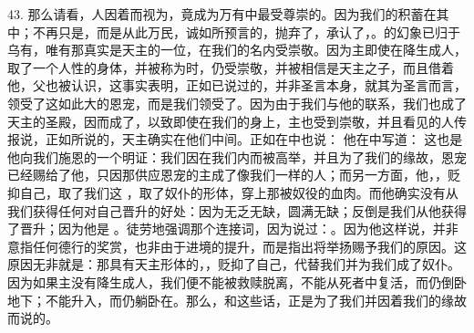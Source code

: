 43. 那么请看，人因着而视为，竟成为万有中最受尊崇的。因为我们的积蓄在其中；不再只是，而是从此万民，诚如所预言的，抛弃了，承认了，。的幻象已归于乌有，唯有那真实是天主的一位，在我们的名内受崇敬。因为主即使在降生成人，取了一个人性的身体，并被称为时，仍受崇敬，并被相信是天主之子，而且借着他，父也被认识，这事实表明，正如已说过的，并非圣言本身，就其为圣言而言，领受了这如此大的恩宠，而是我们领受了。因为由于我们与他的联系，我们也成了天主的圣殿，因而成了，以致即使在我们的身上，主也受到崇敬，并且看见的人传报说，正如所说的，天主确实在他们中间。正如在中也说： 他在中写道： 这也是他向我们施恩的一个明证：我们因在我们内而被高举，并且为了我们的缘故，恩宠已经赐给了他，只因那供应恩宠的主成了像我们一样的人；而另一方面，他，，贬抑自己，取了我们这 ，取了奴仆的形体，穿上那被奴役的血肉。而他确实没有从我们获得任何对自己晋升的好处：因为无乏无缺，圆满无缺；反倒是我们从他获得了晋升；因为他是 。徒劳地强调那个连接词，因为说过：。因为他这样说，并非意指任何德行的奖赏，也非由于进境的提升，而是指出将举扬赐予我们的原因。这原因无非就是：那具有天主形体的，，贬抑了自己，代替我们并为我们成了奴仆。因为如果主没有降生成人，我们便不能被救赎脱离，不能从死者中复活，而仍倒卧地下；不能升入，而仍躺卧在。那么，和这些话，正是为了我们并因着我们的缘故而说的。\par

